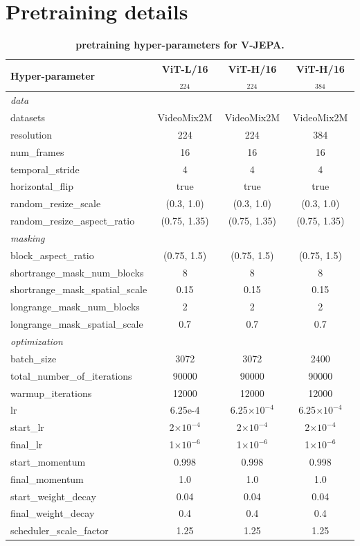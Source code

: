 \documentclass[twocolumn]{fairmeta}
\newcommand{\putalg}{{\small V-JEPA}\xspace}
\theoremstyle{plain}
\theoremstyle{definition}
\theoremstyle{remark}
\begin{document}
\section{Pretraining details} \label{app:pretraining}

\begin{table}
    \centering
    \caption{\bf pretraining hyper-parameters for \putalg.}
    \label{tab:app_hyper}
    {\fontsize{9pt}{9pt}\selectfont
    \setlength{\tabcolsep}{2pt}
    \begin{tabular}{@{} l c c c @{}}
        \toprule
        Hyper-parameter & ViT-L/16$_{224}$ & ViT-H/16$_{224}$ &
        ViT-H/16$_{384}$ \\
        \midrule \textit{data} \\ datasets & VideoMix2M & VideoMix2M &
        VideoMix2M \\ resolution & 224 & 224 & 384 \\ num\_frames & 16 & 16 &
        16 \\ temporal\_stride & 4 & 4 & 4 \\ horizontal\_flip & true & true &
        true \\ random\_resize\_scale & (0.3, 1.0) & (0.3, 1.0) & (0.3, 1.0)
        \\ random\_resize\_aspect\_ratio & (0.75, 1.35) & (0.75, 1.35) &
        (0.75, 1.35)\\ \midrule \textit{masking} \\ block\_aspect\_ratio &
        (0.75, 1.5) & (0.75, 1.5) & (0.75,
        1.5)\\ shortrange\_mask\_num\_blocks & 8 & 8 &
        8\\ shortrange\_mask\_spatial\_scale & 0.15 & 0.15 &
        0.15\\ longrange\_mask\_num\_blocks & 2 & 2 &
        2\\ longrange\_mask\_spatial\_scale & 0.7 & 0.7 & 0.7\\ \midrule
        \textit{optimization} \\ batch\_size & 3072 & 3072 & 2400
        \\ total\_number\_of\_iterations & 90000 & 90000 & 90000
        \\ warmup\_iterations & 12000 & 12000 & 12000 \\ lr & 6.25e-4 &
        6.25$\times10^{-4}$ & 6.25$\times10^{-4}$ \\ start\_lr & 2$\times10^{-4}$ & 2$\times10^{-4}$ & 2$\times10^{-4}$ \\ final\_lr &
        1$\times10^{-6}$ & 1$\times10^{-6}$ & 1$\times10^{-6}$ \\ start\_momentum & 0.998 & 0.998 & 0.998
        \\ final\_momentum & 1.0 & 1.0 & 1.0 \\ start\_weight\_decay & 0.04 &
        0.04 & 0.04 \\ final\_weight\_decay & 0.4 & 0.4 & 0.4
        \\ scheduler\_scale\_factor & 1.25 & 1.25 & 1.25 \\
        

\end{tabular}}
\end{table}
\end{document}

